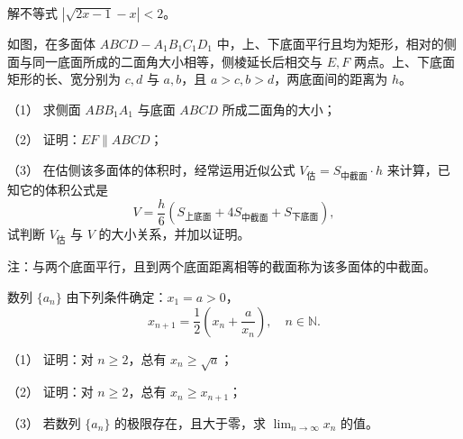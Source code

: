 \begin{question}
解不等式 \(\left|\sqrt{2x-1}-x\right|<2\)。

\Needspace{0.4\textheight}
\end{question}
\begin{question}
如图，在多面体 \(ABCD-A_1B_1C_1D_1\) 中，上、下底面平行且均为矩形，相对的侧面与同一底面所成的二面角大小相等，侧棱延长后相交与 \(E,F\) 两点。上、下底面矩形的长、宽分别为 \(c,d\) 与 \(a,b\)，且 \(a>c,b>d\)，两底面间的距离为 \(h\)。

（1） 求侧面 \(ABB_1A_1\) 与底面 \(ABCD\) 所成二面角的大小；

（2） 证明：\(EF\parallel ABCD\)；

（3） 在估侧该多面体的体积时，经常运用近似公式 \(V_{\text{估}}=S_{\text{中截面}}\cdot h\) 来计算，已知它的体积公式是
\nopagebreak[4]
\[
V=\frac{h}{6}\left(S_{\text{上底面}}+4S_{\text{中截面}}+S_{\text{下底面}}\right),
\]
试判断 \(V_{\text{估}}\) 与 \(V\) 的大小关系，并加以证明。

注：与两个底面平行，且到两个底面距离相等的截面称为该多面体的中截面。
\nopagebreak[4]
\begin{center}\end{center}
\nopagebreak[4]
\end{question}
\begin{question}
数列 \(\{a_n\}\) 由下列条件确定：\(x_1=a>0\)，
\nopagebreak[4]
\[
x_{n+1}=\frac12\left(x_n+\frac{a}{x_n}\right),\quad n\in\mathbb N.
\]

（1） 证明：对 \(n\geqslant2\)，总有 \(x_n\geqslant\sqrt a\)；

（2） 证明：对 \(n\geqslant2\)，总有 \(x_n\geqslant x_{n+1}\)；

（3） 若数列 \(\{a_n\}\) 的极限存在，且大于零，求 \(\lim_{n\to\infty}x_n\) 的值。

\end{question}
